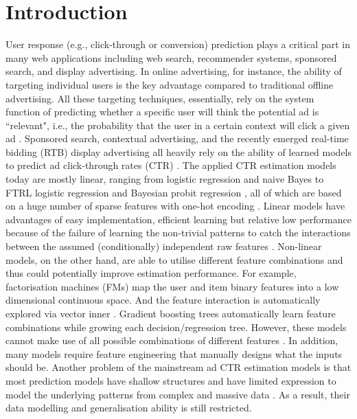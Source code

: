 \documentclass{llncs}
\begin{document}
\section{Introduction}
User response (e.g., click-through or conversion) prediction plays a critical part in many web applications including web search, recommender systems, sponsored search, and display advertising. In online advertising, for instance, the ability of targeting individual users is the key advantage compared to traditional offline advertising.  All these targeting techniques, essentially,  rely on the system function of predicting whether a specific user will think the potential ad is ``relevant", i.e., the probability that the user in a certain context will click a given ad \cite{broder2008computational}. Sponsored search, contextual advertising, and the recently emerged real-time bidding (RTB) display advertising all heavily rely on the ability of learned models to predict ad click-through rates (CTR) \cite{richardson2007predicting,zhang2014optimal}. The applied CTR estimation models today are mostly linear, ranging from logistic regression \cite{richardson2007predicting} and naive Bayes \cite{hand2001idiot} to FTRL logistic regression \cite{mcmahan2013ad} and Bayesian probit regression \cite{graepel2010web}, all of which are based on a huge number of sparse features with one-hot encoding \cite{beck2000high}. Linear models have advantages of easy implementation, efficient learning but relative low performance because of the failure of learning the non-trivial patterns to catch the interactions between the assumed (conditionally) independent raw features \cite{graepel2010web}.  Non-linear models, on the other hand, are  able to utilise different feature combinations and thus could potentially improve estimation performance. For example, factorisation machines (FMs) \cite{oentaryo2014predicting} map the user and item binary features into a low dimensional continuous space. And the feature interaction is automatically explored via vector inner . Gradient boosting trees \cite{trofimov2012using} automatically learn feature combinations while growing each decision/regression tree. However, these models cannot make use of all possible combinations of different features \cite{juan2014idiot}. In addition, many models require feature engineering that manually designs what the inputs should be. Another problem of the mainstream ad CTR estimation models is that most prediction models have shallow structures and have limited expression to model the underlying patterns from complex and massive data \cite{he2014practical}. As a result, their data modelling and generalisation ability is still restricted.
\end{document}
